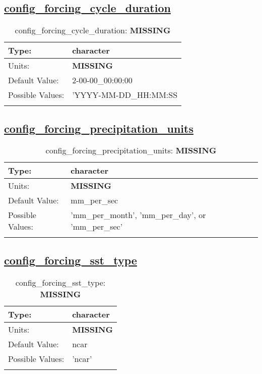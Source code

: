\subsection[config\_forcing\_cycle\_duration]{\hyperref[sec:nm_tab_forcing]{config\_forcing\_cycle\_duration}}
\label{subsec:nm_sec_config_forcing_cycle_duration}
\begin{center}
\begin{longtable}{| p{2.0in} || p{4.0in} |}
    \hline
    Type: & character \\
    \hline
    Units: & {\bf \color{red} MISSING} \\
    \hline
    Default Value: & 2-00-00\_00:00:00 \\
    \hline
    Possible Values: & 'YYYY-MM-DD\_HH:MM:SS \\
    \hline
    \caption{config\_forcing\_cycle\_duration: {\bf \color{red} MISSING}}
\end{longtable}
\end{center}
\subsection[config\_forcing\_precipitation\_units]{\hyperref[sec:nm_tab_forcing]{config\_forcing\_precipitation\_units}}
\label{subsec:nm_sec_config_forcing_precipitation_units}
\begin{center}
\begin{longtable}{| p{2.0in} || p{4.0in} |}
    \hline
    Type: & character \\
    \hline
    Units: & {\bf \color{red} MISSING} \\
    \hline
    Default Value: & mm\_per\_sec \\
    \hline
    Possible Values: & 'mm\_per\_month', 'mm\_per\_day', or 'mm\_per\_sec' \\
    \hline
    \caption{config\_forcing\_precipitation\_units: {\bf \color{red} MISSING}}
\end{longtable}
\end{center}
\subsection[config\_forcing\_sst\_type]{\hyperref[sec:nm_tab_forcing]{config\_forcing\_sst\_type}}
\label{subsec:nm_sec_config_forcing_sst_type}
\begin{center}
\begin{longtable}{| p{2.0in} || p{4.0in} |}
    \hline
    Type: & character \\
    \hline
    Units: & {\bf \color{red} MISSING} \\
    \hline
    Default Value: & ncar \\
    \hline
    Possible Values: & 'ncar' \\
    \hline
    \caption{config\_forcing\_sst\_type: {\bf \color{red} MISSING}}
\end{longtable}
\end{center}
